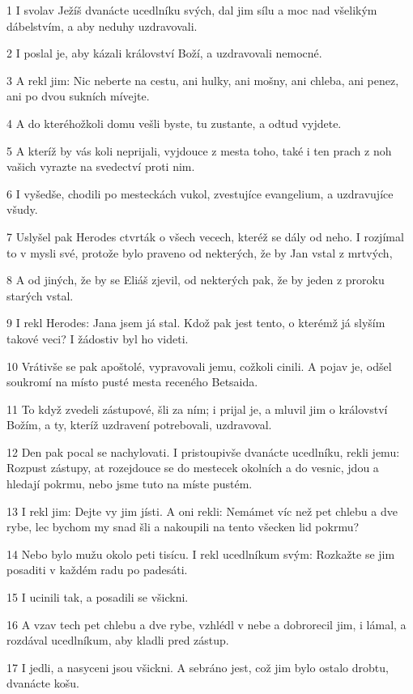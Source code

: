 \par 1 I svolav Ježíš dvanácte ucedlníku svých, dal jim sílu a moc nad všelikým dábelstvím, a aby neduhy uzdravovali.
\par 2 I poslal je, aby kázali království Boží, a uzdravovali nemocné.
\par 3 A rekl jim: Nic neberte na cestu, ani hulky, ani mošny, ani chleba, ani penez, ani po dvou sukních mívejte.
\par 4 A do kteréhožkoli domu vešli byste, tu zustante, a odtud vyjdete.
\par 5 A kteríž by vás koli neprijali, vyjdouce z mesta toho, také i ten prach z noh vašich vyrazte na svedectví proti nim.
\par 6 I vyšedše, chodili po mesteckách vukol, zvestujíce evangelium, a uzdravujíce všudy.
\par 7 Uslyšel pak Herodes ctvrták o všech vecech, kteréž se dály od neho. I rozjímal to v mysli své, protože bylo praveno od nekterých, že by Jan vstal z mrtvých,
\par 8 A od jiných, že by se Eliáš zjevil, od nekterých pak, že by jeden z proroku starých vstal.
\par 9 I rekl Herodes: Jana jsem já stal. Kdož pak jest tento, o kterémž já slyším takové veci? I žádostiv byl ho videti.
\par 10 Vrátivše se pak apoštolé, vypravovali jemu, cožkoli cinili. A pojav je, odšel soukromí na místo pusté mesta receného Betsaida.
\par 11 To když zvedeli zástupové, šli za ním; i prijal je, a mluvil jim o království Božím, a ty, kteríž uzdravení potrebovali, uzdravoval.
\par 12 Den pak pocal se nachylovati. I pristoupivše dvanácte ucedlníku, rekli jemu: Rozpust zástupy, at rozejdouce se do mestecek okolních a do vesnic, jdou a hledají pokrmu, nebo jsme tuto na míste pustém.
\par 13 I rekl jim: Dejte vy jim jísti. A oni rekli: Nemámet víc než pet chlebu a dve rybe, lec bychom my snad šli a nakoupili na tento všecken lid pokrmu?
\par 14 Nebo bylo mužu okolo peti tisícu. I rekl ucedlníkum svým: Rozkažte se jim posaditi v každém radu po padesáti.
\par 15 I ucinili tak, a posadili se všickni.
\par 16 A vzav tech pet chlebu a dve rybe, vzhlédl v nebe a dobrorecil jim, i lámal, a rozdával ucedlníkum, aby kladli pred zástup.
\par 17 I jedli, a nasyceni jsou všickni. A sebráno jest, což jim bylo ostalo drobtu, dvanácte košu.
